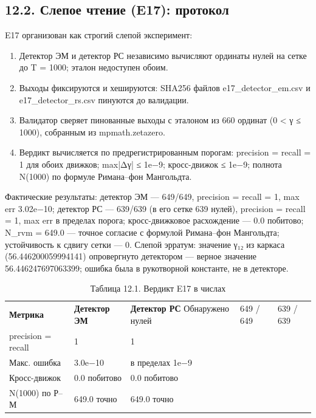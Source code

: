 \documentclass[11pt,a4paper]{article}
\begin{document}
\subsection{12.2. Слепое чтение (E17): протокол}

E17 организован как строгий слепой эксперимент:

\begin{enumerate}
  \item Детектор ЭМ и детектор РС независимо вычисляют ординаты нулей на сетке до T = 1000; эталон недоступен обоим.
  \item Выходы фиксируются и хешируются: SHA256 файлов e17\_detector\_em.csv и e17\_detector\_rs.csv пинуются до валидации.
  \item Валидатор сверяет пинованные выходы с эталоном из 660 ординат (0 < γ ≤ 1000), собранным из mpmath.zetazero.
  \item Вердикт вычисляется по предрегистрированным порогам: precision = recall = 1 для обоих движков; max|Δγ| ≤ 1e−9; кросс-движок ≤ 1e−9; полнота N(1000) по формуле Римана–фон Мангольдта.
\end{enumerate}

Фактические результаты: детектор ЭМ — 649/649, precision = recall = 1, max err 3.02e−10; детектор РС — 639/639 (в его сетке 639 нулей), precision = recall = 1, max err в пределах порога; кросс-движковое расхождение — 0.0 побитово; N\_rvm = 649.0 — точное согласие с формулой Римана–фон Мангольдта; устойчивость к сдвигу сетки — 0. Слепой эрратум: значение γ₁₂ из каркаса (56.446200059994141) опровергнуто детектором — верное значение 56.446247697063399; ошибка была в рукотворной константе, не в детекторе.

\begin{table}[htbp]\centering\small
\caption{Таблица 12.1. Вердикт E17 в числах}
\begin{tabular}{p{} p{} p{}}
\toprule
\textbf{Метрика} & \textbf{Детектор ЭМ} & \textbf{Детектор РС}
\midrule
Обнаружено нулей & 649 / 649 & 639 / 639 \\
precision = recall & 1 & 1 \\
Макс. ошибка & 3.0e−10 & в пределах 1e−9 \\
Кросс-движок & 0.0 побитово & 0.0 побитово \\
N(1000) по Р–М & 649.0 точно & 649.0 точно \\
\bottomrule
\end{tabular}
\end{table}
\end{document}
